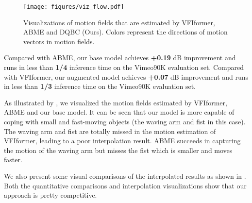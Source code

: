 \documentclass{article}
\begin{document}
\begin{figure}[tbp]
    \centering
    \texttt{[image: figures/viz\_flow.pdf]}
    \caption{Visualizations of motion fields that are estimated by VFIformer, ABME and DQBC (Ours). Colors represent the directions of motion vectors in motion fields.}
    \label{fig:viz_flow}
\end{figure}

Compared with ABME, our base model achieves \textbf{+0.19} dB improvement and runs in less than \textbf{1/4} inference time on the Vimeo90K evaluation set. Compared with VFIformer, our augmented model achieves \textbf{+0.07} dB improvement and runs in less than \textbf{1/3} inference time on the Vimeo90K evaluation set.

As illustrated by , we visualized the motion fields estimated by VFIformer, ABME and our base model. It can be seen that our model is more capable of coping with small and fast-moving objects (the waving arm and fist in this case). The waving arm and fist are totally missed in the motion estimation of VFIformer, leading to a poor interpolation result. ABME succeeds in capturing the motion of the waving arm but misses the fist which is smaller and moves faster.

We also present some visual comparisons of the interpolated results as shown in . Both the quantitative comparisons and interpolation visualizations show that our approach is pretty competitive. 
\end{document}
